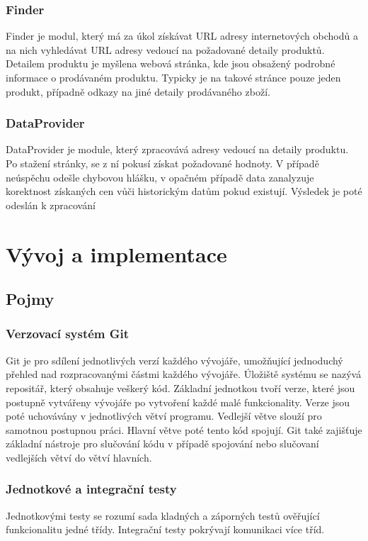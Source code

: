 \documentclass[thesis=B,czech]{FITthesis}[2012/06/26]
\begin{document}
\subsubsection{Finder}
Finder je modul, který má za úkol získávat URL adresy internetových obchodů a na nich vyhledávat URL adresy vedoucí na požadované detaily produktů.
Detailem produktu je myšlena webová stránka, kde jsou obsažený podrobné informace o prodávaném produktu. Typicky je na takové stránce pouze jeden
produkt, případně odkazy na jiné detaily prodávaného zboží.
\subsubsection{DataProvider}
DataProvider je module, který zpracovává adresy vedoucí na detaily produktu. Po stažení stránky, se z ní pokusí získat požadované
hodnoty. V případě neúspěchu odešle chybovou hlášku, v opačném případě data zanalyzuje korektnost získaných cen vůči historickým datům pokud
existují. Výsledek je poté odeslán k zpracování  

\section{Vývoj a implementace}

\subsection{Pojmy}

\subsubsection{Verzovací systém Git}
Git je pro sdílení jednotlivých verzí každého vývojáře, umožňující jednoduchý přehled nad rozpracovanými částmi každého vývojáře.
Úložiště systému se nazývá repositář, který obsahuje veškerý kód.
Základní jednotkou tvoří verze, které jsou postupně vytvářeny vývojáře po vytvoření každé malé funkcionality.
Verze jsou poté uchovávány v jednotlivých větví programu. Vedlejší větve slouží pro samotnou postupnou práci. 
Hlavní větve poté tento kód spojují.
Git také zajišťuje základní nástroje pro slučování kódu v případě spojování nebo slučovaní vedlejších větví do větví hlavních.
\subsubsection{Jednotkové a integrační testy}
Jednotkovými testy se rozumí sada kladných a záporných testů ověřující funkcionalitu jedné třídy.
Integrační testy pokrývají komunikaci více tříd.
\end{document}
